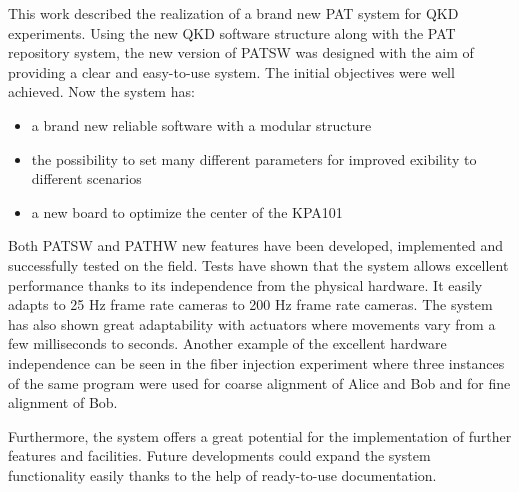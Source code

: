 This work described the realization of a brand new PAT system for QKD experiments. Using the new QKD software structure along with the PAT repository system, the new version of PATSW was designed with the aim of providing a clear and easy-to-use system. The initial objectives were well achieved. Now the system has:
\begin{itemize}
  \item a brand new reliable software with a modular structure
  \item the possibility to set many different parameters for improved exibility to different scenarios
  \item a new board to optimize the center of the KPA101
\end{itemize}
Both PATSW and PATHW new features have been developed, implemented and
successfully tested on the field. Tests have shown that the system allows excellent performance thanks to its independence from the physical hardware. It easily adapts to 25 Hz frame rate cameras to 200 Hz frame rate cameras. The system has also shown great adaptability with actuators where movements vary from a few milliseconds to seconds. Another example of the excellent hardware independence can be seen in the fiber injection experiment where three instances of the same program were used for coarse alignment of Alice and Bob and for fine alignment of Bob.

Furthermore, the system offers a great potential for the implementation of further
features and facilities. Future developments could expand the system functionality easily thanks to the help of ready-to-use documentation.